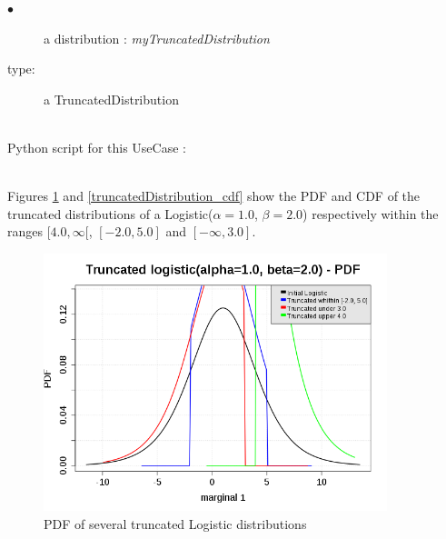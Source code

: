 \noindent%
{
  \begin{description}
  \item[$\bullet$] a distribution : {\itshape myTruncatedDistribution}
  \item[type:]  a TruncatedDistribution
  \end{description}
}

\textspace\\
Python script for this UseCase :


\textspace\\

Figures \ref{truncatedDistribution_pdf} and \ref{truncatedDistribution_cdf} show the PDF and CDF of the truncated distributions of a Logistic($\alpha = 1.0$, $\beta  =2.0$) respectively within the ranges $[4.0, \infty[$,  $[-2.0, 5.0]$ and $[-\infty, 3.0]$.

\begin{figure}[H]
  \begin{center}
    \includegraphics[width=10cm]{Figures/truncatedDistribution_pdf.png}
  \end{center}
  \caption{PDF of several truncated Logistic distributions}
  \label{truncatedDistribution_pdf}
\end{figure}

